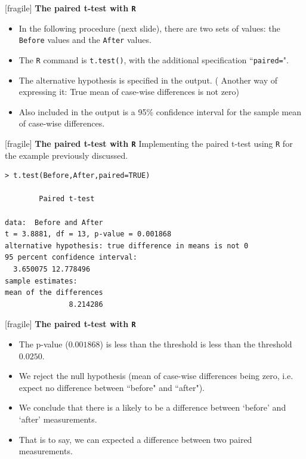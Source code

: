 \documentclass[a4]{beamer}
\begin{document}
[fragile]
\noindent \textbf{The paired t-test with \texttt{R}}

\begin{itemize}
\item In the following procedure (next slide), there are two sets of values: the \texttt{Before} values and the \texttt{After} values.
\item The \texttt{R} command is \texttt{t.test()}, with the additional specification ``\texttt{paired=}".
\item The alternative hypothesis is specified in the output. ( Another way of expressing it: True mean of case-wise differences is not zero)
\item Also included in the output is a 95\% confidence interval for the sample mean of case-wise differences.
\end{itemize}

[fragile]
\noindent \textbf{The paired t-test with \texttt{R}}
Implementing the paired t-test using \texttt{R} for the example previously discussed.
\begin{verbatim}
> t.test(Before,After,paired=TRUE)

        Paired t-test

data:  Before and After
t = 3.8881, df = 13, p-value = 0.001868
alternative hypothesis: true difference in means is not 0
95 percent confidence interval:
  3.650075 12.778496
sample estimates:
mean of the differences
               8.214286

\end{verbatim}


[fragile]
\noindent \textbf{The paired t-test with \texttt{R}}
\begin{itemize}
\item The p-value ($0.001868$) is less than the threshold is less than the threshold $0.0250$.
\item We reject the null hypothesis (mean of case-wise differences being zero, i.e. expect no difference between ``before" and ``after").
\item We conclude that there is a likely to be a difference between `before' and `after' measurements.
\item That is to say, we can expected a difference between two paired measurements.
\end{itemize}
\end{document}

